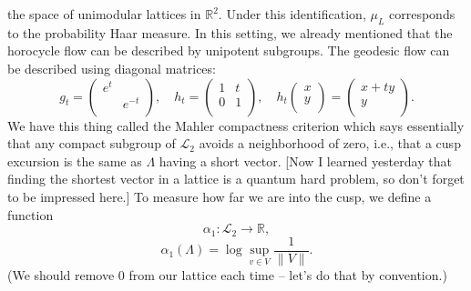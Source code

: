 \documentclass[reqno]{amsart} 
\numberwithin{theorem}{section}
\numberwithin{equation}{section}
\begin{document}
the space of unimodular lattices in $\mathbb{R}^2$.  Under this identification, $\mu_L$ corresponds to the probability Haar measure.  In this setting, we already mentioned that the horocycle flow can be described by unipotent subgroups.  The geodesic flow can be described using diagonal matrices:
\begin{equation*}
  g_t =
  \begin{pmatrix}
    e^t    &  \\
           & e^{- t} \\
  \end{pmatrix},
  \quad
  h_t =
  \begin{pmatrix}
    1    & t \\
    0 & 1 \\
  \end{pmatrix},
  \quad 
  h_t
  \begin{pmatrix}
    x    \\
    y  \\
  \end{pmatrix}
  =
  \begin{pmatrix}
    x + t y    \\
    y  \\
  \end{pmatrix}.
\end{equation*}
We have this thing called the Mahler compactness criterion which says essentially that any compact subgroup of $\mathcal{L}_2$ avoids a neighborhood of zero, i.e., that a cusp excursion is the same as $\Lambda$ having a short vector.  [Now I learned yesterday that finding the shortest vector in a lattice is a quantum hard problem, so don't forget to be impressed here.]  To measure how far we are into the cusp, we define a function
\begin{equation*}
  \alpha_1 : \mathcal{L}_2 \rightarrow \mathbb{R},
\end{equation*}
\begin{equation*}
  \alpha_1(\Lambda) = \log \sup_{v \in V} \frac{1}{\lVert V \rVert}.
\end{equation*}
(We should remove $0$ from our lattice each time -- let's do that by convention.)
\end{document}
